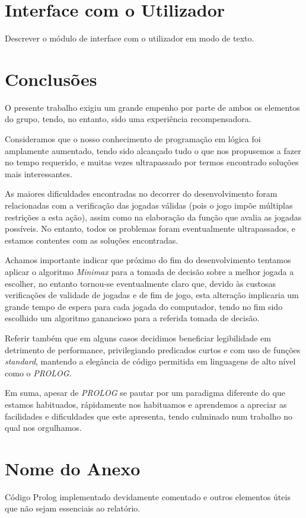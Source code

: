 \documentclass[a4paper]{article}
\begin{document}
\newpage

\section{Interface com o Utilizador}

Descrever o módulo de interface com o utilizador em modo de texto.

\newpage

\section{Conclusões}
O presente trabalho exigiu um grande empenho por parte de ambos os elementos do grupo, tendo, no entanto, sido uma experiência recompensadora.

Consideramos que o nosso conhecimento de programação em lógica foi amplamente aumentado, tendo sido alcançado tudo o que nos propusemos a fazer no tempo requerido, e muitas vezes ultrapassado por termos encontrado soluções mais interessantes.

As maiores dificuldades encontradas no decorrer do desenvolvimento foram relacionadas com a verificação das jogadas válidas (pois o jogo impõe múltiplas restrições a esta ação), assim como na elaboração da função que avalia as jogadas possíveis. No entanto, todos os problemas foram eventualmente ultrapassados, e estamos contentes com as soluções encontradas.

Achamos importante indicar que próximo do fim do desenvolvimento tentamos aplicar o algoritmo \textit{Minimax} para a tomada de decisão sobre a melhor jogada a escolher, no entanto tornou-se eventualmente claro que, devido às custosas verificações de validade de jogadas e de fim de jogo, esta alteração implicaria um grande tempo de espera para cada jogada do computador, tendo no fim sido escolhido um algoritmo ganancioso para a referida tomada de decisão.

Referir também que em alguns casos decidimos beneficiar legibilidade em detrimento de performance, privilegiando predicados curtos e com uso de funções \textit{standard}, mantendo a elegância de código permitida em linguagens de alto nível como o \textit{PROLOG}.

Em suma, apesar de \textit{PROLOG} se pautar por um paradigma diferente do que estamos habituados, rápidamente nos habituamos e aprendemos a apreciar as facilidades e dificuldades que este apresenta, tendo culminado num trabalho no qual nos orgulhamos.


\clearpage
{}
\renewcommand\refname{Bibliografia}




\newpage
\appendix
\section{Nome do Anexo}
Código Prolog implementado devidamente comentado e outros elementos úteis que não sejam essenciais ao relatório.
\end{document}
